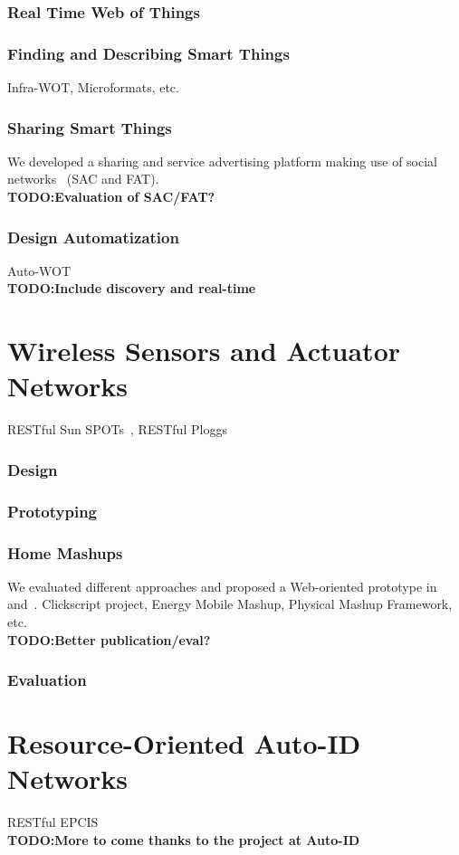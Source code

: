 \documentclass[a4paper,10pt]{report}
\newcommand{\todo}[1]{\\ \textbf{TODO:#1} \\}
\begin{document}
      \subsection{Real Time Web of Things}
      \subsection{Finding and Describing Smart Things}
      Infra-WOT, Microformats, etc.
      \subsection{Sharing Smart Things}
      We developed a sharing and service advertising platform making use of social networks~\cite{guinard_sharing_2010} (SAC and FAT). 
      \todo{Evaluation of SAC/FAT?}
      \subsection{Design Automatization}
      Auto-WOT
      \todo{Include discovery and real-time}

\chapter{Wireless Sensors and Actuator Networks}
  RESTful Sun SPOTs~\cite{Guinard09}, RESTful Ploggs~\cite{dominique_guinard_are_2009,Guinard09b,weiss_emeter:interactive_2009}
  \subsection{Design}
  \subsection{Prototyping}
  \subsection{Home Mashups}
  We evaluated different approaches and proposed a Web-oriented prototype in~\cite{kovatsch_embedding_2010} and~\cite{guinard_mashing_2010}.
  Clickscript project, Energy Mobile Mashup, Physical Mashup Framework, etc.
  \todo{Better publication/eval?}
  \subsection{Evaluation}

 \chapter{Resource-Oriented Auto-ID Networks}
 RESTful EPCIS~\cite{guinard_giving_2010}
 \todo{More to come thanks to the project at Auto-ID}
\end{document}
